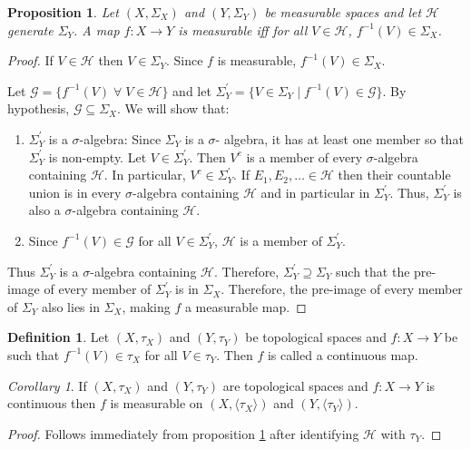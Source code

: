 \documentclass{article}
\theoremstyle{plain}
\numberwithin{thm}{section}
\theoremstyle{plain}
\newtheorem{prop}{Proposition}
\numberwithin{prop}{section}
\theoremstyle{definition}
\newtheorem{defn}{Definition}
\numberwithin{defn}{section}
\theoremstyle{remark}
\newtheorem{cor}{Corollary}
\numberwithin{equation}{section}
\begin{document}
\begin{prop}\label{s2p2}
Let $(X, \Sigma_X)$ and $(Y, \Sigma_Y)$ be measurable spaces and let 
$\mathcal{H}$ generate $\Sigma_Y$. A map $f: X \rightarrow Y$ is measurable iff 
for all $V \in \mathcal{H}$, $f^{-1}(V) \in \Sigma_X$.
\end{prop}
\begin{proof}
If $V \in \mathcal{H}$ then $V \in \Sigma_Y$. Since $f$ is measurable, 
$f^{-1}(V) \in \Sigma_X$.

Let $\mathcal{G} = \{f^{-1}(V) \;\forall\; V \in \mathcal{H}\}$ and let 
$\Sigma_Y^\prime = \{V \in \Sigma_Y \;|\; f^{-1}(V) \in \mathcal{G}\}$. By
hypothesis, $\mathcal{G} \subseteq \Sigma_X$. We will show that:
\begin{enumerate}
\item $\Sigma_Y^\prime$ is a $\sigma$-algebra: Since $\Sigma_Y$ is a $\sigma$-
algebra, it has at least one member so that $\Sigma_Y^\prime$ is non-empty.
Let $V \in \Sigma_Y^\prime$. Then $V^c$ is a member of every $\sigma$-algebra
containing $\mathcal{H}$. In particular, $V^c \in \Sigma_Y^\prime$. If $E_1, E_2,
\ldots \in \mathcal{H}$ then their countable union is in every $\sigma$-algebra
containing $\mathcal{H}$ and in particular in $\Sigma_Y^\prime$. Thus, 
$\Sigma_Y^\prime$ is also a $\sigma$-algebra containing $\mathcal{H}$. 

\item Since $f^{-1}(V) \in \mathcal{G}$ for all $V \in \Sigma_Y^\prime$, 
$\mathcal{H}$ is a member of $\Sigma_Y^\prime$.
\end{enumerate}

Thus $\Sigma_Y^\prime$ is a $\sigma$-algebra containing $\mathcal{H}$. Therefore,
$\Sigma_Y^\prime \supseteq \Sigma_Y$ such that the pre-image of every member of
$\Sigma_Y^\prime$ is in $\Sigma_X$. Therefore, the pre-image of every member of 
$\Sigma_Y$ also lies in $\Sigma_X$, making $f$ a measurable map.
\end{proof}

\begin{defn}\label{s2d2}
Let $(X, \tau_X)$ and $(Y, \tau_Y)$ be topological spaces and $f: X \rightarrow Y$
be such that $f^{-1}(V) \in \tau_X$ for all $V \in \tau_Y$. Then $f$ is called a
continuous map.
\end{defn}

\begin{cor}\label{s2c1}
If $(X, \tau_X)$ and $(Y, \tau_Y)$ are topological spaces and $f: X \rightarrow Y$
is continuous then $f$ is measurable on $(X, \langle\tau_X\rangle)$ and $(Y, \langle
\tau_Y\rangle)$.
\end{cor}
\begin{proof}
Follows immediately from proposition \ref{s2p2} after identifying $\mathcal{H}$
with $\tau_Y$.
\end{proof}
\end{document}

